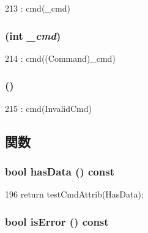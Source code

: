 \begin{DoxyCode}
213 : cmd(_cmd) { }
\end{DoxyCode}
\hypertarget{classMemCmd_aada95a87c42e8678ad2d33ddee49371d}{
\subsubsection[{MemCmd}]{ (int {\em \_\-cmd})}}
\label{classMemCmd_aada95a87c42e8678ad2d33ddee49371d}



\begin{DoxyCode}
214 : cmd((Command)_cmd) { }
\end{DoxyCode}
\hypertarget{classMemCmd_a2012f22fb5b2ed31685bcb07d3025045}{
\subsubsection[{MemCmd}]{ ()}}
\label{classMemCmd_a2012f22fb5b2ed31685bcb07d3025045}



\begin{DoxyCode}
215 : cmd(InvalidCmd) { }
\end{DoxyCode}


\subsection{関数}
\hypertarget{classMemCmd_a0effbd4cf91891700ac41e86defe4aa6}{
\subsubsection[{hasData}]{\setlength{\rightskip}{0pt plus 5cm}bool hasData () const}}
\label{classMemCmd_a0effbd4cf91891700ac41e86defe4aa6}



\begin{DoxyCode}
196 { return testCmdAttrib(HasData); }
\end{DoxyCode}
\hypertarget{classMemCmd_a32759931a1b2d6380407c6a18abd46e3}{
\subsubsection[{isError}]{\setlength{\rightskip}{0pt plus 5cm}bool isError () const}}
\label{classMemCmd_a32759931a1b2d6380407c6a18abd46e3}



